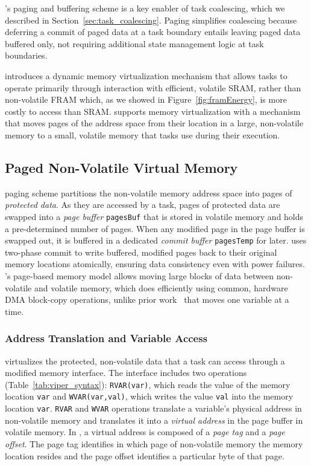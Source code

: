 \sys's paging and buffering scheme is a key enabler of task coalescing, which we described in Section~\ref{sec:task_coalescing}. Paging simplifies coalescing because deferring a commit of paged data at a task boundary entails leaving paged data buffered only, not requiring additional state management logic at task boundaries.

\sys introduces a dynamic memory virtualization mechanism that allows tasks to operate primarily through interaction with efficient, volatile SRAM, rather than non-volatile FRAM which, as we showed in Figure~\ref{fig:framEnergy}, is more costly to access than SRAM. \sys supports memory virtualization with a mechanism that moves pages of the address space from their location in a large, non-volatile memory to a small, volatile memory that tasks use during their execution.

\subsection{Paged Non-Volatile Virtual Memory} 

\sys paging scheme partitions the non-volatile memory address space into pages of {\em protected data}. As they are accessed by a task, pages of protected data are swapped into a {\em page buffer} \texttt{pagesBuf} that is stored in volatile memory and holds a pre-determined number of pages. When any modified page in the page buffer is swapped out, it is buffered in a dedicated {\em commit buffer} \texttt{pagesTemp} for later. \sys uses two-phase commit to write buffered, modified pages back to their original memory locations atomically, ensuring data consistency even with power failures. \sys's page-based memory model allows moving large blocks of data between non-volatile and volatile memory, which \sys does efficiently using common, hardware DMA block-copy operations, unlike prior work~\cite{chain,alpaca} that moves one variable at a time.

\subsubsection{Address Translation and Variable Access}

\sys virtualizes the protected, non-volatile data that a task can access through a modified memory interface. The interface includes two operations (Table~\ref{tab:viper_syntax}): \texttt{RVAR(var)}, which reads the value of the memory location {\tt var} and \texttt{WVAR(var,val)}, which writes the value {\tt val} into the memory location {\tt var}. {\tt RVAR} and {\tt WVAR} operations translate a variable's physical address in non-volatile memory and translates it into a \emph{virtual address} in the page buffer in volatile memory.  In \sys, a virtual address is composed of a \emph{page tag} and a \emph{page offset}. The page tag identifies in which page of non-volatile memory the memory location resides and the page offset identifies a particular byte of that page. 

